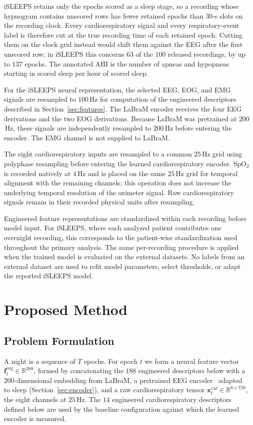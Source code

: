 \documentclass[a4paper,fleqn]{cas-sc}
\begin{document}
iSLEEPS retains only the epochs scored as a sleep stage, so a recording whose
hypnogram contains unscored rows has fewer retained epochs than $30$-s slots on
the recording clock. Every cardiorespiratory signal and every respiratory-event
label is therefore cut at the true recording time of each retained epoch. Cutting
them on the clock grid instead would shift them against the EEG after the first
unscored row; in iSLEEPS this concerns $63$ of the $100$ released recordings, by up
to $137$ epochs. The annotated AHI is the number of apneas and hypopneas starting
in scored sleep per hour of scored sleep.

For the iSLEEPS neural representation, the selected EEG, EOG, and EMG signals
are resampled to $100$\,Hz for computation of the engineered descriptors
described in Section~\ref{sec:features}. The LaBraM encoder receives the four
EEG derivations and the two EOG derivations. Because LaBraM was pretrained at
$200$\,Hz, these signals are independently resampled to $200$\,Hz before entering
the encoder. The EMG channel is not supplied to LaBraM.

The eight cardiorespiratory inputs are resampled to a common $25$\,Hz grid
using polyphase resampling before entering the learned cardiorespiratory
encoder. SpO$_2$ is recorded natively at $4$\,Hz and is placed on the same
$25$\,Hz grid for temporal alignment with the remaining channels; this
operation does not increase the underlying temporal resolution of the
oximeter signal. Raw cardiorespiratory signals remain in their recorded
physical units after resampling.

Engineered feature representations are standardized within each recording
before model input. For iSLEEPS, where each analyzed patient contributes one
overnight recording, this corresponds to the patient-wise standardization used
throughout the primary analysis. The same per-recording procedure is applied
when the trained model is evaluated on the external datasets. No labels from an
external dataset are used to refit model parameters, select thresholds, or
adapt the reported iSLEEPS model.

\section{Proposed Method}
\label{sec:method}
\subsection{Problem Formulation}
A night is a sequence of $T$ epochs. For epoch $t$ we form a neural feature vector
$\mathbf{f}^{\mathrm{eeg}}_t\in\mathbb{R}^{388}$, formed by concatenating the $188$
engineered descriptors below with a $200$-dimensional embedding from LaBraM, a
pretrained EEG encoder~\cite{labram2024} adapted to sleep (Section~\ref{sec:encoder}), and a raw cardiorespiratory tensor
$\mathbf{x}^{\mathrm{car}}_t\in\mathbb{R}^{8\times750}$, the eight channels at $25$\,Hz.
The $14$ engineered cardiorespiratory descriptors defined below are used by the baseline
configuration against which the learned encoder is measured.
\end{document}
